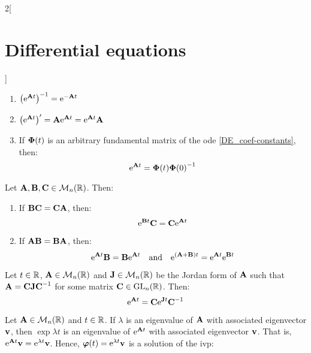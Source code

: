 \documentclass[../../../main.tex]{subfiles}
\begin{document}
\begin{multicols}{2}[\section{Differential equations}]
\begin{prop}
\begin{enumerate}
      \item ${\left(\mathrm{e}^{\boldsymbol{\mathrm{A}}t}\right)}^{-1}=\mathrm{e}^{-\boldsymbol{\mathrm{A}}t}$
      \item $\left(\mathrm{e}^{\boldsymbol{\mathrm{A}}t}\right)'=\boldsymbol{\mathrm{A}}\mathrm{e}^{\boldsymbol{\mathrm{A}}t}=\mathrm{e}^{\boldsymbol{\mathrm{A}}t}\boldsymbol{\mathrm{A}}$
      \item If $\boldsymbol{\mathrm{\Phi}}(t)$ is an arbitrary fundamental matrix of the ode \eqref{DE_coef-constants}, then: $$\mathrm{e}^{\boldsymbol{\mathrm{A}}t}=\boldsymbol{\mathrm{\Phi}}(t){\boldsymbol{\mathrm{\Phi}}(0)}^{-1}$$
    \end{enumerate}
  \end{prop}
  \begin{lemma}
    Let $\boldsymbol{\mathrm{A}},\boldsymbol{\mathrm{B}},\boldsymbol{\mathrm{C}}\in\mathcal{M}_n(\mathbb{R})$. Then:
    \begin{enumerate}
      \item If $\boldsymbol{\mathrm{B}}\boldsymbol{\mathrm{C}}=\boldsymbol{\mathrm{C}}\boldsymbol{\mathrm{A}}$, then: $$\mathrm{e}^{\boldsymbol{\mathrm{B}}t}\boldsymbol{\mathrm{C}}=\boldsymbol{\mathrm{C}}\mathrm{e}^{\boldsymbol{\mathrm{A}}t}$$
      \item If $\boldsymbol{\mathrm{A}}\boldsymbol{\mathrm{B}}=\boldsymbol{\mathrm{B}}\boldsymbol{\mathrm{A}}$, then: $$\mathrm{e}^{\boldsymbol{\mathrm{A}}t}\boldsymbol{\mathrm{B}}=\boldsymbol{\mathrm{B}}\mathrm{e}^{\boldsymbol{\mathrm{A}}t}\quad\text{and}\quad\mathrm{e}^{(\boldsymbol{\mathrm{A}}+\boldsymbol{\mathrm{B}})t}=\mathrm{e}^{\boldsymbol{\mathrm{A}}t}\mathrm{e}^{\boldsymbol{\mathrm{B}}t}$$
    \end{enumerate}
  \end{lemma}
  \begin{corollary}
    Let $t\in\mathbb{R}$, $\boldsymbol{\mathrm{A}}\in\mathcal{M}_n(\mathbb{R})$ and $\boldsymbol{\mathrm{J}}\in\mathcal{M}_n(\mathbb{R})$ be the Jordan form of $\boldsymbol{\mathrm{A}}$ such that $\boldsymbol{\mathrm{A}}=\boldsymbol{\mathrm{C}}\boldsymbol{\mathrm{J}}\boldsymbol{\mathrm{C}}^{-1}$ for some matrix $\boldsymbol{\mathrm{C}}\in\mathrm{GL}_n(\mathbb{R})$. Then: $$\mathrm{e}^{\boldsymbol{\mathrm{A}}t}=\boldsymbol{\mathrm{C}}\mathrm{e}^{\boldsymbol{\mathrm{J}}t}\boldsymbol{\mathrm{C}}^{-1}$$
  \end{corollary}
  \begin{prop}
    Let $\boldsymbol{\mathrm{A}}\in\mathcal{M}_n(\mathbb{R})$ and $t\in\mathbb{R}$. If $\lambda$ is an eigenvalue of $\boldsymbol{\mathrm{A}}$ with associated eigenvector $\boldsymbol{\mathrm{v}}$, then $\exp{\lambda t}$ is an eigenvalue of $\mathrm{e}^{\boldsymbol{\mathrm{A}}t}$ with associated eigenvector $\boldsymbol{\mathrm{v}}$. That is, $\mathrm{e}^{\boldsymbol{\mathrm{A}}t}\boldsymbol{\mathrm{v}}=\mathrm{e}^{\lambda t}\boldsymbol{\mathrm{v}}$. Hence, $\boldsymbol{\mathrm{\varphi}}(t)=\mathrm{e}^{\lambda t}\boldsymbol{\mathrm{v}}$ is a solution of the ivp:

\end{prop}
\end{multicols}
\end{document}
